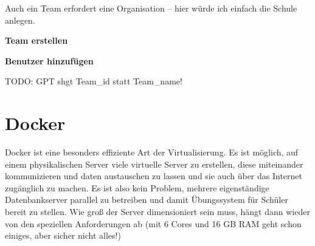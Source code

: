 \documentclass[
  letterpaper,
  DIV=11]{scrreprt}
\newenvironment{Shaded}{\begin{snugshade}}{\end{snugshade}}
\newcommand{\AttributeTok}[1]{\textcolor[rgb]{0.40,0.45,0.13}{#1}}
\newcommand{\DataTypeTok}[1]{\textcolor[rgb]{0.68,0.00,0.00}{#1}}
\newcommand{\ExtensionTok}[1]{\textcolor[rgb]{0.00,0.23,0.31}{#1}}
\newcommand{\NormalTok}[1]{\textcolor[rgb]{0.00,0.23,0.31}{#1}}
\newcommand{\OperatorTok}[1]{\textcolor[rgb]{0.37,0.37,0.37}{#1}}
\newcommand{\StringTok}[1]{\textcolor[rgb]{0.13,0.47,0.30}{#1}}
\newcommand{\VariableTok}[1]{\textcolor[rgb]{0.07,0.07,0.07}{#1}}
\begin{document}
Auch ein Team erfordert eine Organisation -- hier würde ich einfach die
Schule anlegen.

\textbf{Team erstellen}

\begin{Shaded}
\end{Shaded}

\textbf{Benutzer hinzufügen}

\begin{Shaded}
\end{Shaded}

TODO: GPT shgt Team\_id statt Team\_name!


\chapter{Docker}\label{docker}

Docker ist eine besonders effiziente Art der Virtualisierung. Es ist
möglich, auf einem physikalischen Server viele virtuelle Server zu
erstellen, diese miteinander kommunizieren und daten austauschen zu
lassen und sie auch über das Internet zugänglich zu machen. Es ist also
kein Problem, mehrere eigenständige Datenbankserver parallel zu
betreiben und damit Übungssystem für Schüler bereit zu stellen. Wie groß
der Server dimensioniert sein muss, hängt dann wieder von den speziellen
Anforderungen ab (mit 6 Cores und 16 GB RAM geht schon einiges, aber
sicher nicht alles!)
\end{document}
